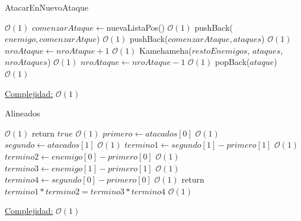 \documentclass[10pt,a4paper]{article}
\begin{document}
\begin{algorithm}
\caption{AtacarEnNuevoAtaque}
\begin{algorithmic}

 \Comment $\mathcal{O}(1)$
	\State $comenzarAtaque \gets $nuevaListaPos() \Comment $\mathcal{O}(1)$
	\State pushBack($enemigo, comenzarAtque$) \Comment $\mathcal{O}(1)$
	\State pushBack($comenzarAtaque, ataques$) \Comment $\mathcal{O}(1)$
	\State $nroAtaque \gets nroAtaque + 1$ \Comment $\mathcal{O}(1)$
	\State Kamehameha($restoEnemigos$, $ataques$, $nroAtaques$) \Comment $\mathcal{O}(1)$
	\State $nroAtaque \gets 	nroAtaque - 1$ \Comment $\mathcal{O}(1)$
	\State popBack($ataque$) \Comment $\mathcal{O}(1)$
\EndIf

\EndFunction
\end{algorithmic}
\underline{Complejidad:} $\mathcal{O}(1)$\\
\end{algorithm}

\begin{algorithm}
\caption{Alineados}
\begin{algorithmic}
  	 \Comment $\mathcal{O}(1)$
  		\State return $true$ \Comment $\mathcal{O}(1)$
  	\Else
  		\State $primero \gets atacados[0]$ \Comment $\mathcal{O}(1)$
  		\State $segundo \gets atacados[1]$ \Comment $\mathcal{O}(1)$
  		\State $termino1 \gets segundo[1] - primero[1]$ \Comment $\mathcal{O}(1)$
  		\State $termino2 \gets enemigo[0] - primero[0]$ \Comment $\mathcal{O}(1)$
    		\State $termino3 \gets enemigo[1] - primero[1]$ \Comment $\mathcal{O}(1)$
      	\State $termino4 \gets segundo[0] - primero[0]$ \Comment $\mathcal{O}(1)$
      	\State return $termino1*termino2 = termino3*termino4$ \Comment $\mathcal{O}(1)$ 
  	\EndIf
\EndFunction
\end{algorithmic}
\underline{Complejidad:} $\mathcal{O}(1)$\\
\end{algorithm}
\end{document}
